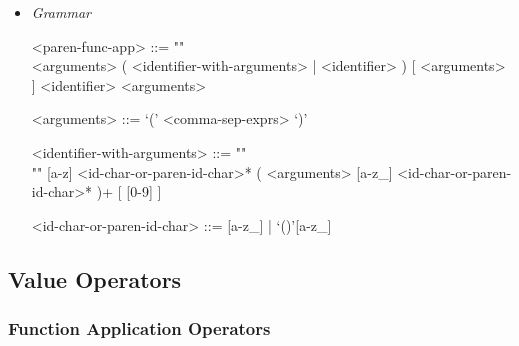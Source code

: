 \documentclass{article}
\begin{document}
\begin{itemize}
\item \textit{Grammar}
\begin{grammar}
<paren-func-app> ::= ""\\
<arguments> ( <identifier-with-arguments> | <identifier> ) [ <arguments> ]
\alt <identifier> <arguments>

<arguments> ::= `(' <comma-sep-exprs> `)'

<identifier-with-arguments> ::= ""\\""
[a-z] <id-char-or-paren-id-char>* ( <arguments> [a-z_]
<id-char-or-paren-id-char>* )+ [ [0-9] ]

<id-char-or-paren-id-char> ::= [a-z_] | `()'[a-z_]
\end{grammar}

\end{itemize}

\subsection{Value Operators}

\subsubsection{Function Application Operators}
\end{document}
